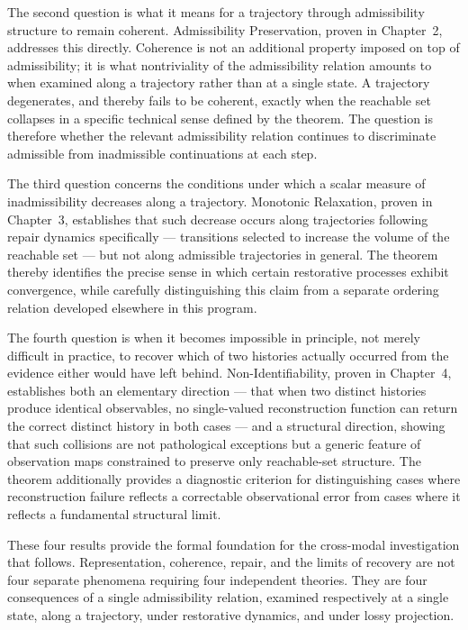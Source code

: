 The second question is what it means for a trajectory through admissibility structure to remain coherent. Admissibility Preservation, proven in Chapter~2, addresses this directly. Coherence is not an additional property imposed on top of admissibility; it is what nontriviality of the admissibility relation amounts to when examined along a trajectory rather than at a single state. A trajectory degenerates, and thereby fails to be coherent, exactly when the reachable set collapses in a specific technical sense defined by the theorem. The question is therefore whether the relevant admissibility relation continues to discriminate admissible from inadmissible continuations at each step.

The third question concerns the conditions under which a scalar measure of inadmissibility decreases along a trajectory. Monotonic Relaxation, proven in Chapter~3, establishes that such decrease occurs along trajectories following repair dynamics specifically — transitions selected to increase the volume of the reachable set — but not along admissible trajectories in general. The theorem thereby identifies the precise sense in which certain restorative processes exhibit convergence, while carefully distinguishing this claim from a separate ordering relation developed elsewhere in this program.

The fourth question is when it becomes impossible in principle, not merely difficult in practice, to recover which of two histories actually occurred from the evidence either would have left behind. Non-Identifiability, proven in Chapter~4, establishes both an elementary direction — that when two distinct histories produce identical observables, no single-valued reconstruction function can return the correct distinct history in both cases — and a structural direction, showing that such collisions are not pathological exceptions but a generic feature of observation maps constrained to preserve only reachable-set structure. The theorem additionally provides a diagnostic criterion for distinguishing cases where reconstruction failure reflects a correctable observational error from cases where it reflects a fundamental structural limit.

These four results provide the formal foundation for the cross-modal investigation that follows. Representation, coherence, repair, and the limits of recovery are not four separate phenomena requiring four independent theories. They are four consequences of a single admissibility relation, examined respectively at a single state, along a trajectory, under restorative dynamics, and under lossy projection.
